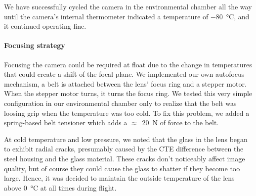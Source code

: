 We have successfully cycled the camera in the environmental chamber all the way until the camera's internal thermometer indicated a temperature of \SI{-80}{\celsius}, and it continued operating fine.

\paragraph{Focusing strategy}
Focusing the camera could be required at float due to the change in temperatures that could create a shift of the focal plane. We implemented our own autofocus mechanism, a belt is attached between the lens' focus ring and a stepper motor. When the stepper motor turns, it turns the focus ring. We tested this very simple configuration in our environmental chamber only to realize that the belt was loosing grip when the temperature was too cold. To fix this problem, we added a spring-based belt tensioner which adds a $\approx$~\SI{20}{\newton} of force to the belt.

At cold temperature and low pressure, we noted that the glass in the lens began to exhibit radial cracks, presumably caused by the CTE difference between the steel housing and the glass material. These cracks don't noticeably affect image quality, but of course they could cause the glass to shatter if they become too large. Hence, it was decided to maintain the outside temperature of the lens above \SI{0}{\celsius} at all times during flight.

